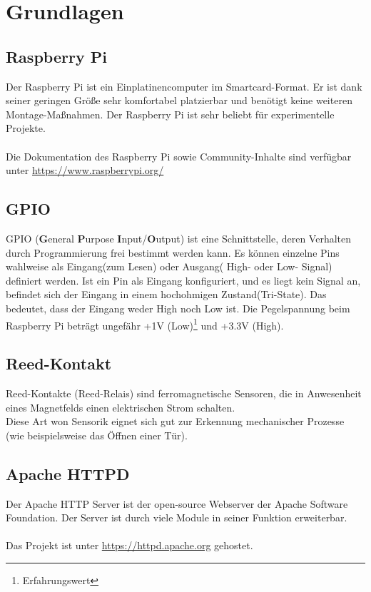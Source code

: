 \chapter{Grundlagen}

\section{Raspberry Pi}
Der Raspberry Pi ist ein Einplatinencomputer im Smartcard-Format. Er ist dank seiner geringen Größe sehr komfortabel platzierbar und benötigt keine weiteren Montage-Maßnahmen. Der Raspberry Pi ist sehr beliebt für experimentelle Projekte.\\
\\
Die Dokumentation des Raspberry Pi sowie Community-Inhalte sind verfügbar unter \href{https://www.raspberrypi.org/}{https://www.raspberrypi.org/}
\vspace{1.0cm}

\section{GPIO}
GPIO (\textbf{G}eneral \textbf{P}urpose \textbf{I}nput/\textbf{O}utput) ist eine Schnittstelle, deren Verhalten durch Programmierung frei bestimmt werden kann. Es können einzelne Pins wahlweise als Eingang(zum Lesen) oder Ausgang( High- oder Low- Signal) definiert werden. Ist ein Pin als Eingang konfiguriert, und es liegt kein Signal an, befindet sich der Eingang in einem hochohmigen Zustand(Tri-State). Das bedeutet, dass der Eingang weder High noch Low ist. Die Pegelspannung beim Raspberry Pi beträgt ungefähr +1V (Low)\footnote{Erfahrungswert} und +3.3V (High).
\vspace{1.0cm}

\section{Reed-Kontakt}
Reed-Kontakte (Reed-Relais) sind ferromagnetische Sensoren, die in Anwesenheit eines Magnetfelds einen elektrischen Strom schalten.\\
Diese Art won Sensorik eignet sich gut zur Erkennung mechanischer Prozesse (wie beispielsweise das Öffnen einer Tür).
\vspace{1.0cm}

\section{Apache HTTPD}
Der Apache HTTP Server ist der open-source Webserver der Apache Software Foundation. Der Server ist durch viele Module in seiner Funktion erweiterbar.\\
\\
Das Projekt ist unter \url{https://httpd.apache.org} gehostet.
\vspace{1.0cm}

